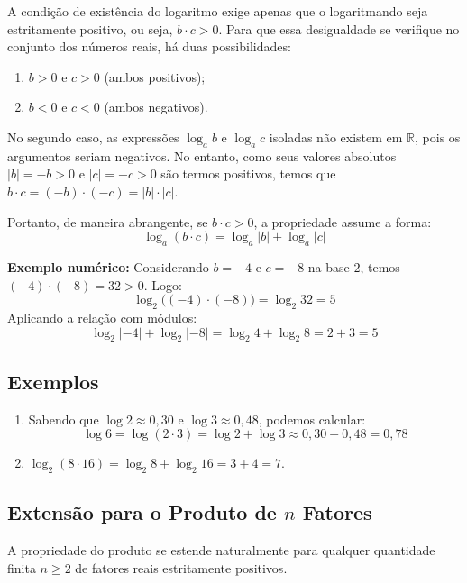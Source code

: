 \documentclass[12pt,a4paper]{report}
\begin{document}
	\begin{destaque}
		A condição de existência do logaritmo exige apenas que o logaritmando seja estritamente positivo, ou seja, $b \cdot c > 0$. Para que essa desigualdade se verifique no conjunto dos números reais, há duas possibilidades:
		\begin{enumerate}[label=\alph*)]
			\item $b > 0$ e $c > 0$ (ambos positivos);
			\item $b < 0$ e $c < 0$ (ambos negativos).
		\end{enumerate}
		
		No segundo caso, as expressões $\log_a b$ e $\log_a c$ isoladas não existem em $\mathbb{R}$, pois os argumentos seriam negativos. No entanto, como seus valores absolutos $|b| = -b > 0$ e $|c| = -c > 0$ são termos positivos, temos que $b \cdot c = (-b) \cdot (-c) = |b| \cdot |c|$. 
		
		Portanto, de maneira abrangente, se $b \cdot c > 0$, a propriedade assume a forma:
		$$\log_a (b \cdot c) = \log_a |b| + \log_a |c|$$
		
		\textbf{Exemplo numérico:}  
		Considerando $b = -4$ e $c = -8$ na base $2$, temos $(-4) \cdot (-8) = 32 > 0$. Logo:
		$$\log_2 \bigl((-4) \cdot (-8)\bigr) = \log_2 32 = 5$$
		Aplicando a relação com módulos:
		$$\log_2 |-4| + \log_2 |-8| = \log_2 4 + \log_2 8 = 2 + 3 = 5$$
	\end{destaque}
	
	\subsection*{Exemplos}
	
	\begin{enumerate}[label=\textbf{\alph*)}]
		\item Sabendo que $\log 2 \approx 0{,}30$ e $\log 3 \approx 0{,}48$, podemos calcular:
		$$\log 6 = \log(2 \cdot 3) = \log 2 + \log 3 \approx 0{,}30 + 0{,}48 = 0{,}78$$
		
		\item $\log_2 (8 \cdot 16) = \log_2 8 + \log_2 16 = 3 + 4 = 7$.
	\end{enumerate}
	
	\subsection*{Extensão para o Produto de $n$ Fatores}
	
	A propriedade do produto se estende naturalmente para qualquer quantidade finita $n \geqslant 2$ de fatores reais estritamente positivos.
	
\end{document}
